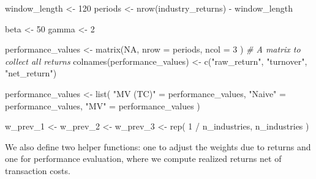 \documentclass[
]{krantz}
\newenvironment{Shaded}{\begin{snugshade}}{\end{snugshade}}
\newcommand{\AttributeTok}[1]{\textcolor[rgb]{0.61,0.61,0.61}{#1}}
\newcommand{\CommentTok}[1]{\textcolor[rgb]{0.37,0.37,0.37}{\textit{#1}}}
\newcommand{\ConstantTok}[1]{\textcolor[rgb]{0,0,0}{#1}}
\newcommand{\DecValTok}[1]{\textcolor[rgb]{0.06,0.06,0.06}{#1}}
\newcommand{\FunctionTok}[1]{\textcolor[rgb]{0,0,0}{#1}}
\newcommand{\NormalTok}[1]{#1}
\newcommand{\OtherTok}[1]{\textcolor[rgb]{0.37,0.37,0.37}{#1}}
\newcommand{\SpecialCharTok}[1]{\textcolor[rgb]{0,0,0}{#1}}
\newcommand{\StringTok}[1]{\textcolor[rgb]{0.5,0.5,0.5}{#1}}
\begin{document}
\begin{Shaded}
\begin{Highlighting}[]
\NormalTok{window\_length }\OtherTok{\textless{}{-}} \DecValTok{120}
\NormalTok{periods }\OtherTok{\textless{}{-}} \FunctionTok{nrow}\NormalTok{(industry\_returns) }\SpecialCharTok{{-}}\NormalTok{ window\_length}

\NormalTok{beta }\OtherTok{\textless{}{-}} \DecValTok{50}
\NormalTok{gamma }\OtherTok{\textless{}{-}} \DecValTok{2}

\NormalTok{performance\_values }\OtherTok{\textless{}{-}} \FunctionTok{matrix}\NormalTok{(}\ConstantTok{NA}\NormalTok{,}
  \AttributeTok{nrow =}\NormalTok{ periods,}
  \AttributeTok{ncol =} \DecValTok{3}
\NormalTok{) }\CommentTok{\# A matrix to collect all returns}
\FunctionTok{colnames}\NormalTok{(performance\_values) }\OtherTok{\textless{}{-}} \FunctionTok{c}\NormalTok{(}\StringTok{"raw\_return"}\NormalTok{, }\StringTok{"turnover"}\NormalTok{, }\StringTok{"net\_return"}\NormalTok{)}

\NormalTok{performance\_values }\OtherTok{\textless{}{-}} \FunctionTok{list}\NormalTok{(}
  \StringTok{"MV (TC)"} \OtherTok{=}\NormalTok{ performance\_values,}
  \StringTok{"Naive"} \OtherTok{=}\NormalTok{ performance\_values,}
  \StringTok{"MV"} \OtherTok{=}\NormalTok{ performance\_values}
\NormalTok{)}

\NormalTok{w\_prev\_1 }\OtherTok{\textless{}{-}}\NormalTok{ w\_prev\_2 }\OtherTok{\textless{}{-}}\NormalTok{ w\_prev\_3 }\OtherTok{\textless{}{-}} \FunctionTok{rep}\NormalTok{(}
  \DecValTok{1} \SpecialCharTok{/}\NormalTok{ n\_industries,}
\NormalTok{  n\_industries}
\NormalTok{)}
\end{Highlighting}
\end{Shaded}

We also define two helper functions: one to adjust the weights due to returns and one for performance evaluation, where we compute realized returns net of transaction costs.
\end{document}
